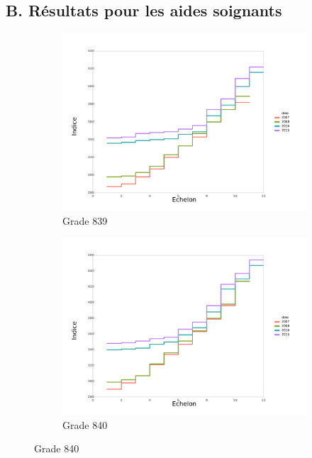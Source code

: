 \documentclass[11pt,a4paper]{article}
\begin{document}
\clearpage

\subsection{B. Résultats pour les aides soignants}
\setcounter{table}{0}
\setcounter{figure}{0}
\renewcommand{\thefigure}{B.\arabic{figure}}
\renewcommand{\thetable}{B.\arabic{table}}




\begin{figure}[ht] 
  \caption{Evolution des grilles: grade par grade}
  \label{echelon_by_negAA} 
  \begin{subfigure}[b]{0.33\linewidth}
      \caption{Grade 839} 
    \label{echelon_by_neg_0} 
    \centering
    \includegraphics[width=1\linewidth]{AS_839_grille_by_neg.pdf} 
  \end{subfigure}%
  \begin{subfigure}[b]{0.33\linewidth}
        \caption{Grade 840} 
    \label{echelon_by_neg_1} 
    \centering
    \includegraphics[width=1\linewidth]{AS_840_grille_by_neg.pdf} 

\end{subfigure}
\end{figure}
\end{document}
